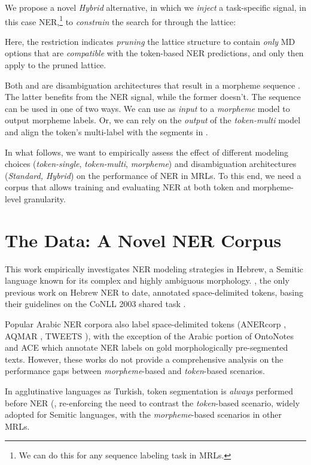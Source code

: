 \documentclass[11pt,a4paper]{article}
\newcommand{\TOKMACRO}{{\em token-single}\xspace}
\newcommand{\MULMACRO}{{\em token-multi}\xspace}
\newcommand{\MORMACRO}{{\em morpheme}\xspace}
\newcommand{\FLIPMACRO}{{\em Hybrid}\xspace}
\begin{document}
We propose 
a novel \FLIPMACRO alternative, in which we {\em inject} a task-specific signal, in this  case NER,\footnote{We can do this for any sequence labeling task in MRLs.}  
to {\em constrain}  the search for  through the  lattice:
    
Here, the restriction  indicates {\em pruning} the  lattice structure  to  contain {\em only}  MD options that are  {\em compatible} with the token-based NER  predictions, and only then apply  to the pruned lattice.

Both  and  are  disambiguation architectures that result in a  morpheme sequence . The latter benefits from the NER signal, while the former doesn't.
The sequence   can  be used in one of two ways. 
 We can use   as \emph{input} to a \MORMACRO model to output morpheme labels.
Or, we can {rely on} the {\em output} of the  \MULMACRO model and align the token's multi-label with the  segments  in .

In what follows, we want to empirically assess the effect of different modeling choices (\TOKMACRO, \MULMACRO, \MORMACRO) and disambiguation architectures ({\em Standard, Hybrid}) on the performance of NER in MRLs. To this end, we need a corpus that allows  training and evaluating NER  at both  token and morpheme-level granularity.

\section{The Data: A Novel NER Corpus} 
\label{sec:the-data}

This work empirically investigates NER modeling strategies in  Hebrew, a Semitic language known for its complex and highly ambiguous morphology.
 \citet{naama}, the only previous work on Hebrew NER to date, annotated  space-delimited tokens, basing their guidelines on the CoNLL 2003 shared task \cite{Chinchor99}.  
 
 Popular Arabic NER corpora also label space-delimited tokens (ANERcorp \cite{benajiba-2007-anersys}, AQMAR \cite{mohit-etal-2012-recall}, TWEETS \cite{darwish-2013-named}), with the exception of the Arabic portion of OntoNotes \cite{weischedel2013ontonotes} and ACE \cite{linguistic2008ace} 
which annotate NER labels on gold morphologically pre-segmented texts. However, these works do not provide  a  comprehensive analysis  on the performance gaps between \MORMACRO-based and {\em token}-based  scenarios. 

In  agglutinative languages  as Turkish, token segmentation is {\em always} performed before NER (\citet{tur-data-2003,turk-tweet-seker}, re-enforcing the need to contrast the  {\em token}-based scenario, widely adopted for Semitic languages, with the \MORMACRO-based scenarios in other MRLs. 
\end{document}
